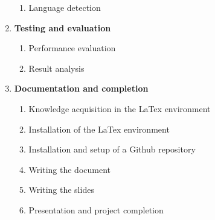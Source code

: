 \begin{enumerate}
\begin{enumerate}
    \item Language detection
  \end{enumerate}
  \item \textbf{Testing and evaluation}
  \begin{enumerate}
    \item Performance evaluation
    \item Result analysis
  \end{enumerate}
  \item \textbf{Documentation and completion}
  \begin{enumerate}
    \item{Knowledge acquisition in the LaTex environment} 
    \item{Installation of the LaTex environment}
    \item{Installation and setup of a Github repository}
    \item{Writing the document}
    \item{Writing the slides}
    \item{Presentation and project completion} 
  \end{enumerate} 
\end{enumerate}



